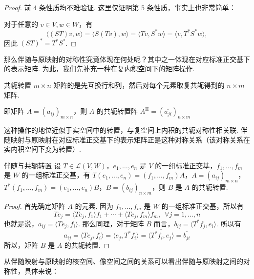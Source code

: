 \begin{proof}
    前 4 条性质均不难验证. 这里仅证明第 5 条性质，事实上也非常简单：

    对于任意的 $ v \in V, w \in W $，有
    \[
        \langle (ST)v, w \rangle = \langle S(Tv), w \rangle = \langle Tv, S^*w \rangle = \langle v, T^*S^*w \rangle,
    \]
    因此 $ (ST)^* = T^*S^* $.
\end{proof}

那么伴随与原映射的对称性究竟体现在何处呢？其中之一体现在对应标准正交基下的表示矩阵. 为此，我们先补充一种在复内积空间下的矩阵操作.

\begin{definition}{共轭转置}{} 
    $ m \times n $ 矩阵的是先互换行和列，然后对每个元素取复共轭得到的 $ n \times m $ 矩阵.

    即矩阵 $ A = (a_{ij})_{m \times n} $，则 $ A $ 的共轭转置阵 $ A^{\mathrm{H}} = (\overline{a_{ji}})_{n \times m} $
\end{definition}

这种操作的地位近似于实空间中的转置，与复空间上内积的共轭对称性相关联. 伴随映射与原映射在对应标准正交基下的表示矩阵正是这种对称关系（该对称关系在实内积空间下变为转置）.

\begin{theorem}{}{伴随与共轭转置}
    设 $ T \in \mathcal{L}(V, W) $，$ e_1, \ldots , e_n $ 是 $ V $ 的一组标准正交基，$ f_1, \ldots , f_m $ 是 $ W $ 的一组标准正交基，有 $ T(e_1, \ldots , e_n) = (f_1, \ldots , f_m)A $，$ A = (a_{ij})_{m \times n} $，$ T^*(f_1, \ldots , f_m) =(e_1, \ldots , e_n)B $，$ B = (b_{ij})_{n \times m} $，则 $ B $ 是 $ A $ 的共轭转置.
\end{theorem}

\begin{proof}
    首先确定矩阵 $ A $ 的元素. 因为 $ f_1, \ldots , f_m $ 是 $ W $ 的一组标准正交基，所以有
    \[ Te_j = \langle Te_j, f_1 \rangle f_1 + \cdots + \langle Te_j, f_m \rangle f_m,\enspace \forall j = 1, \ldots , n \]
    也就是说，$ a_{ij} = \langle Te_j, f_i \rangle $. 那么同理，对于矩阵 $ B $ 而言，$ b_{ij} = \langle T^*f_j, e_i \rangle $. 所以有
    \[ a_{ij} = \langle Te_j, f_i \rangle = \langle e_j, T^*f_i \rangle = \overline{\langle T^*f_i, e_j \rangle} = \overline{b_{ji}} \]
    所以，矩阵 $ B $ 是 $ A $ 的共轭转置.
\end{proof}

从伴随映射与原映射的核空间、像空间之间的关系可以看出伴随与原映射之间的对称性，具体来说：

